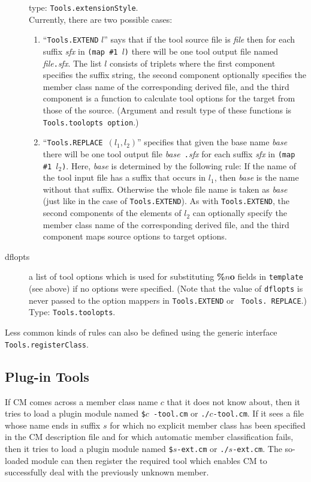 \documentclass[titlepage,letterpaper]{article}
\begin{document}
\begin{description}
type: {\tt Tools.extensionStyle}. \\
Currently, there are two possible cases:
\begin{enumerate}
\item ``{\tt Tools.EXTEND} $l$'' says that if the tool source file is
{\it file} then for each suffix {\it sfx} in {\tt (map \#1 $l$)} there
will be one tool output file named {\it file}{\tt .}{\it sfx}.  The
list $l$ consists of triplets where the first component specifies the
suffix string, the second component optionally specifies the
member class name of the corresponding derived file, and the
third component is a function to calculate tool options for the 
target from those of the source. (Argument and result type of these
functions is {\tt Tools.toolopts option}.)
\item ``{\tt Tools.REPLACE }$(l_1, l_2)$'' specifies that given the
base name {\it base} there will be one tool output file {\it base}{\tt
.}{\it sfx} for each suffix {\it sfx} in {\tt (map \#1 $l_2$)}.  Here,
{\it base} is determined by the following rule: If the name of the
tool input file has a suffix that occurs in $l_1$, then {\it base} is
the name without that suffix.  Otherwise the whole file name is taken
as {\it base} (just like in the case of {\tt Tools.EXTEND}).  As with
{\tt Tools.EXTEND}, the second components of the elements of $l_2$ can
optionally specify the member class name of the corresponding derived
file, and the third component maps source options to target options.
\end{enumerate}
\item[dflopts] a list of tool options which is used for
substituting {\bf \%$n$o} fields in {\tt template} (see above) if no
options were specified.  (Note that the value of {\tt dflopts} is never
passed to the option mappers in {\tt Tools.EXTEND} or {\tt
Tools. REPLACE}.)  Type: {\tt Tools.toolopts}.
\end{description}

Less common kinds of rules can also be defined using the generic
interface {\tt Tools.registerClass}.

\subsection{Plug-in Tools}

If CM comes across a member class name $c$ that it does not know
about, then it tries to load a plugin module named {\tt \$}$c${\tt
-tool.cm} or {\tt ./}$c${\tt -tool.cm}.  If it sees a file whose name
ends in suffix $s$ for which no explicit member class has been
specified in the CM description file and for which automatic
member classification fails, then it tries to load a plugin module
named {\tt \$}$s${\tt -ext.cm} or {\tt ./}$s${\tt -ext.cm}.  The
so-loaded module can then register the required tool which enables CM
to successfully deal with the previously unknown member.
\end{document}
